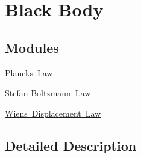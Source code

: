 \hypertarget{group___e_g_x_phys-_electrodynamics-_black_body}{}\section{Black Body}
\label{group___e_g_x_phys-_electrodynamics-_black_body}
\subsection*{Modules}
\begin{DoxyCompactItemize}
\item 
\mbox{\hyperlink{group___e_g_x_phys-_electrodynamics-_black_body-_plancks_law}{Planck\textquotesingle{}s Law}}
\item 
\mbox{\hyperlink{group___e_g_x_phys-_electrodynamics-_black_body-_stefan_boltzmann_law}{Stefan-\/\+Boltzmann Law}}
\item 
\mbox{\hyperlink{group___e_g_x_phys-_electrodynamics-_black_body-_wiens_displacement_law}{Wien\textquotesingle{}s Displacement Law}}
\end{DoxyCompactItemize}


\subsection{Detailed Description}
